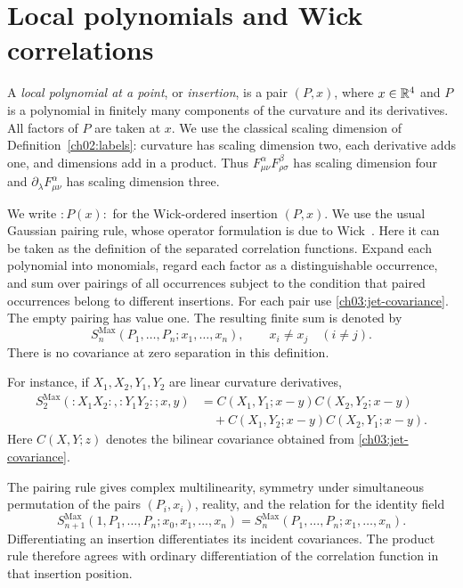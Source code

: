 \section{Local polynomials and Wick correlations}\label{ch03:wick}

A \emph{local polynomial at a point}, or \emph{insertion}, is a pair
$(P,x)$, where $x\in\mathbb R^4$ and $P$ is a polynomial in finitely many
components of the curvature and its derivatives. All factors of $P$ are
taken at $x$. We use the classical scaling dimension of
Definition~\ref{ch02:labels}: curvature has scaling dimension two, each
derivative adds one, and dimensions add in a product. Thus
$F^\alpha_{\mu\nu}F^\beta_{\rho\sigma}$ has scaling dimension four and
$\partial_\lambda F^\alpha_{\mu\nu}$ has scaling dimension three.

We write \({:}P(x){:}\) for the Wick-ordered insertion $(P,x)$. We use the
usual Gaussian pairing rule, whose operator formulation is due to
Wick~\cite{Wick1950}. Here it can be taken as the definition of the
separated correlation functions. Expand each polynomial into monomials,
regard each factor as a distinguishable occurrence, and sum over pairings
of all occurrences subject to the condition that paired occurrences
belong to different insertions. For each pair use
\eqref{ch03:jet-covariance}. The empty pairing has value one. The
resulting finite sum is denoted by
\[
 S_n^{\mathrm{Max}}(P_1,\ldots,P_n;x_1,\ldots,x_n),
 \qquad x_i\ne x_j\quad(i\ne j).
\]
There is no covariance at zero separation in this definition.

For instance, if $X_1,X_2,Y_1,Y_2$ are linear curvature derivatives,
\begin{align*}
 S_2^{\mathrm{Max}}({:}X_1X_2{:},{:}Y_1Y_2{:};x,y)
 &=C(X_1,Y_1;x-y)C(X_2,Y_2;x-y)\\
 &\quad+C(X_1,Y_2;x-y)C(X_2,Y_1;x-y).
\end{align*}
Here $C(X,Y;z)$ denotes the bilinear covariance obtained from
\eqref{ch03:jet-covariance}.

The pairing rule gives complex multilinearity, symmetry under simultaneous
permutation of the pairs $(P_i,x_i)$, reality, and the relation for the identity field
\[
 S_{n+1}^{\mathrm{Max}}(1,P_1,\ldots,P_n;x_0,x_1,\ldots,x_n)
 =S_n^{\mathrm{Max}}(P_1,\ldots,P_n;x_1,\ldots,x_n).
\]
Differentiating an insertion differentiates its incident covariances.
The product rule therefore agrees with ordinary differentiation of the
correlation function in that insertion position.

